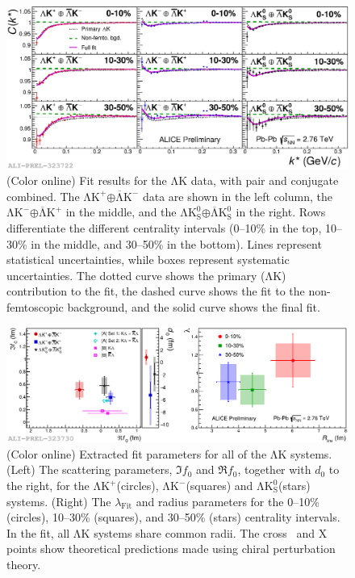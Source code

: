 \documentclass{svproc}
\newcommand{\LamK}{$\mathrm{\Lambda}\mathrm{K}$\xspace}
\newcommand{\LamKchP}{$\mathrm{\Lambda}\mathrm{K^{+}}$\xspace}
\newcommand{\ALamKchM}{$\overline{\mathrm{\Lambda}}\mathrm{K^{-}}$\xspace}
\newcommand{\LamKchM}{$\mathrm{\Lambda}\mathrm{K^{-}}$\xspace}
\newcommand{\ALamKchP}{$\overline{\mathrm{\Lambda}}\mathrm{K^{+}}$\xspace}
\newcommand{\LamKs}{$\mathrm{\Lambda}\mathrm{K^{0}_{S}}$\xspace}
\newcommand{\ALamKs}{$\overline{\mathrm{\Lambda}}\mathrm{K^{0}_{S}}$\xspace}
\begin{document}
\begin{figure}[h!]
  \centering
  \includegraphics[width=\linewidth]{./Figures/Approved/OtherFormats/EPS/2019-06-11-canKStarCfwFits_CombineConj_AllAn_LabelLines.eps}
  \caption[\LamK data with fits]
  {
  (Color online) Fit results for the \LamK data, with pair and conjugate combined.
  The \LamKchP$\oplus$\ALamKchM data are shown in the left column, the \LamKchM$\oplus$\ALamKchP in the middle, and the \LamKs$\oplus$\ALamKs in the right. 
  Rows differentiate the different centrality intervals (0--10\% in the top, 10--30\% in the middle, and 30--50\% in the bottom).
  Lines represent statistical uncertainties, while boxes represent systematic uncertainties.
  The dotted curve shows the primary (\LamK) contribution to the fit, the dashed curve shows the fit to the non-femtoscopic background, and the solid curve shows the final fit.
 }
  \label{fig:LamKFits_3Res}
\end{figure}

\begin{figure}[h]
  \centering
  \includegraphics[width=\textwidth]{./Figures/Approved/OtherFormats/EPS/2019-06-11-FinalResults_Comp3An.eps}
  \caption[Extracted Scattering Parameters]
  {
  (Color online) Extracted fit parameters for all of the \LamK systems.  
  (Left) The scattering parameters, $\Im f_{0}$ and $\Re f_{0}$, together with $d_{0}$ to the right, for the \LamKchP (circles), \LamKchM (squares) and \LamKs (stars) systems.  
  (Right) The $\lambda_{\mathrm{Fit}}$ and radius parameters for the 0--10\% (circles), 10--30\% (squares), and 30--50\% (stars) centrality intervals.  
  In the fit, all \LamK systems share common radii.
  The cross~\cite{Liu:2006xja} and X~\cite{Mai:2009ce} points show theoretical predictions made using chiral perturbation theory.
  }
  \label{fig:ScattParams_3Res}
\end{figure}
\end{document}

